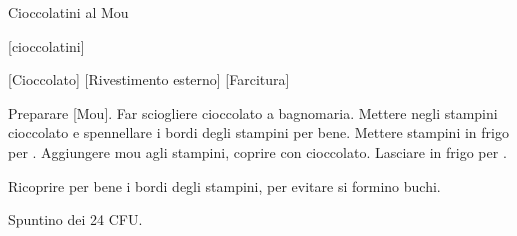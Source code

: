 \begin{recipe}{Cioccolatini al Mou}
    \begin{header}
        [cioccolatini]
    
        [Cioccolato]
        [Rivestimento esterno]
        [Farcitura]
        
    \end{header}
    
    \begin{ingredients}
    \end{ingredients}
    
    \begin{preparation}
        \step Preparare [Mou].
        \step Far sciogliere cioccolato a bagnomaria.
        \step Mettere negli stampini cioccolato e spennellare i bordi degli stampini per bene.
        \step Mettere stampini in frigo per .
        \step Aggiungere mou agli stampini, coprire con cioccolato.
        \step Lasciare in frigo per .
    \end{preparation}
    
    \begin{suggestion}
        \suggestionMark Ricoprire per bene i bordi degli stampini, per evitare si formino buchi.
    \end{suggestion}
    
    \begin{hint}
        Spuntino dei 24 CFU.
    \end{hint}
    
\end{recipe}
